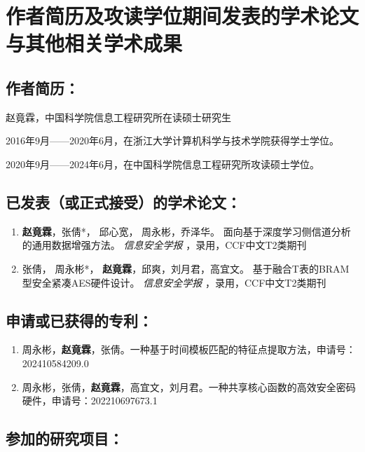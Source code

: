 \chapter{作者简历及攻读学位期间发表的学术论文与其他相关学术成果}

\section*{作者简历：}
赵竟霖，中国科学院信息工程研究所在读硕士研究生

2016年9月——2020年6月，在浙江大学计算机科学与技术学院获得学士学位。


2020年9月——2024年6月，在中国科学院信息工程研究所攻读硕士学位。


\section*{已发表（或正式接受）的学术论文：}
{
	\setlist[enumerate]{}%
	\begin{enumerate}[nosep]
		\item \textbf{赵竟霖}，张倩*， 邱心宽， 周永彬，乔泽华。 面向基于深度学习侧信道分析的通用数据增强方法。 \textit{信息安全学报 } ，录用，CCF中文T2类期刊
		\item 张倩， 周永彬*， \textbf{赵竟霖}，邱爽，刘月君，高宜文。 基于融合T表的BRAM型安全紧凑AES硬件设计。 \textit{信息安全学报 } ，录用，CCF中文T2类期刊
		
	\end{enumerate}  
} 


\section*{申请或已获得的专利：}
{
	\setlist[enumerate]{}%
	\begin{enumerate}
		\item 周永彬，\textbf{赵竟霖}，张倩。一种基于时间模板匹配的特征点提取方法，申请号：202410584209.0
		\item 周永彬，张倩，\textbf{赵竟霖}，高宜文，刘月君。一种共享核心函数的高效安全密码硬件，申请号：202210697673.1
		
	\end{enumerate}  
}  


\section*{参加的研究项目：}

